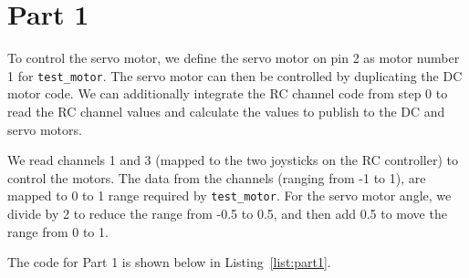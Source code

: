 \begin{filecontents}[overwrite]{./sections/part1_list.tex}
        test_motor_pub.publish(servo_motor);

        px4_usleep(20000);
    }

    PX4_INFO("The motor will be stopped");
    test_motor.timestamp = hrt_absolute_time();
    test_motor.motor_number = DC_MOTOR;
    test_motor.value = 0.5;
    test_motor.driver_instance = 0;
    test_motor.timeout_ms = 0;

    test_motor_pub.publish(test_motor);

    PX4_INFO("The servo motor will be stopped");
    servo_motor.timestamp = hrt_absolute_time();
    servo_motor.motor_number = SERVO_MOTOR;
    servo_motor.value = 0.5;
    servo_motor.driver_instance = 0;
    servo_motor.timeout_ms = 0;

    test_motor_pub.publish(servo_motor);

    return 0;
}
\end{lstlisting}
\end{filecontents}

\section*{Part 1}

To control the servo motor, we define the servo motor on pin 2 as motor number 1 for \texttt{test\_motor}. The servo motor can then be controlled by duplicating the DC motor code. We can additionally integrate the RC channel code from step 0 to read the RC channel values and calculate the values to publish to the DC and servo motors.

We read channels 1 and 3 (mapped to the two joysticks on the RC controller) to control the motors. The data from the channels (ranging from -1 to 1), are mapped to 0 to 1 range required by \texttt{test\_motor}. For the servo motor angle, we divide by 2 to reduce the range from -0.5 to 0.5, and then add 0.5 to move the range from 0 to 1.

The code for Part 1 is shown below in Listing~\ref{list:part1}.

